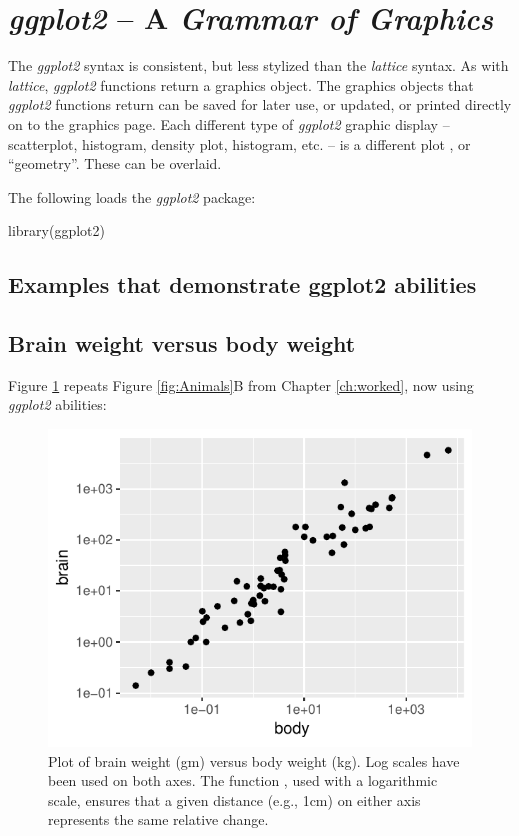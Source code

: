 \section{\textit{ggplot2} -- A \textit{Grammar of  Graphics}}\label{sec:ggplot}


The {\em ggplot2} syntax is consistent, but less stylized than the
\textit{lattice} syntax.  As with \textit{lattice}, {\em ggplot2}
functions return a graphics object. The graphics objects that {\em
    ggplot2} functions return can be saved for later use, or updated,
  or printed directly on to the graphics page. Each different type of
{\em ggplot2} graphic display -- scatterplot, histogram, density plot,
histogram, etc. -- is a different plot , or
``geometry''.  These can be overlaid.

The following loads the {\em ggplot2} package:
\begin{Schunk}
\begin{Sinput}
library(ggplot2)
\end{Sinput}
\end{Schunk}

\subsection{Examples that demonstrate ggplot2 abilities}

\subsection*{Brain weight versus body weight}
Figure \ref{fig:ggplot2-brain} repeats Figure \ref{fig:Animals}B from Chapter
\ref{ch:worked}, now using {\em ggplot2} abilities:
\begin{figure}
\begin{Schunk}


\centerline{\includegraphics[width=0.7\linewidth]{figs/07-ggplot2-brain-1} }

\end{Schunk}
\caption{Plot of brain weight (gm) versus body weight (kg).
Log scales have been used on both axes.  The function
, used with a logarithmic scale, ensures
that a given distance (e.g., 1cm) on either axis represents
the same relative change.\label{fig:ggplot2-brain}}
\end{figure}

